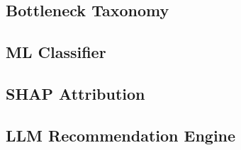 
\subsection{Bottleneck Taxonomy}
\label{sec:method:taxonomy}

%

\subsection{ML Classifier}
\label{sec:method:ml}


\subsection{SHAP Attribution}
\label{sec:method:shap}


\subsection{LLM Recommendation Engine}
\label{sec:method:llm}

